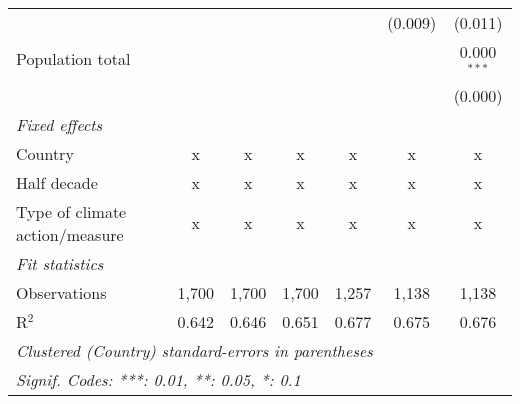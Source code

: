 \begin{tabular}{lcccccc}
                                                                            &         &                &                &                & (0.009)        & (0.011)\\   
   Population total                                                         &         &                &                &                &                & 0.000$^{***}$\\   
                                                                            &         &                &                &                &                & (0.000)\\   
   \emph{Fixed effects}\\
   Country                                                                  & x       & x              & x              & x              & x              & x\\  
   Half decade                                                              & x       & x              & x              & x              & x              & x\\  
   Type of climate action/measure                                           & x       & x              & x              & x              & x              & x\\  
   \midrule \emph{Fit statistics}\\
   Observations                                                             & 1,700   & 1,700          & 1,700          & 1,257          & 1,138          & 1,138\\  
   R$^2$                                                                    & 0.642   & 0.646          & 0.651          & 0.677          & 0.675          & 0.676\\  
   \midrule
   \multicolumn{7}{l}{\emph{Clustered (Country) standard-errors in parentheses}}\\
   \multicolumn{7}{l}{\emph{Signif. Codes: ***: 0.01, **: 0.05, *: 0.1}}\\
\end{tabular}
\par\endgroup


